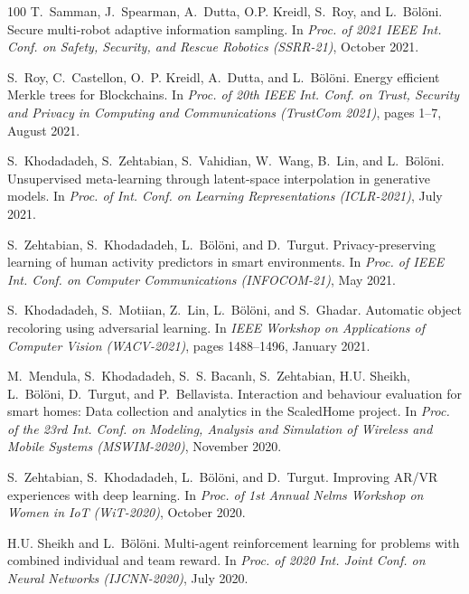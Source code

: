 \begin{thebibliography}{100}
T.~Samman, J.~Spearman, A.~Dutta, O.P. Kreidl, S.~Roy, and L.~Bölöni.
\newblock Secure multi-robot adaptive information sampling.
\newblock In {\em Proc. of 2021 IEEE Int. Conf. on Safety, Security, and Rescue
  Robotics (SSRR-21)}, October 2021.

S.~Roy, C.~Castellon, O.~P. Kreidl, A.~Dutta, and L.~Bölöni.
\newblock Energy efficient {M}erkle trees for {B}lockchains.
\newblock In {\em Proc. of 20th IEEE Int. Conf. on Trust, Security and Privacy
  in Computing and Communications (TrustCom 2021)}, pages 1--7, August 2021.

S.~Khodadadeh, S.~Zehtabian, S.~Vahidian, W.~Wang, B.~Lin, and L.~Bölöni.
\newblock Unsupervised meta-learning through latent-space interpolation in
  generative models.
\newblock In {\em Proc. of Int. Conf. on Learning Representations (ICLR-2021)},
  July 2021.

S.~Zehtabian, S.~Khodadadeh, L.~Bölöni, and D.~Turgut.
\newblock Privacy-preserving learning of human activity predictors in smart
  environments.
\newblock In {\em Proc. of IEEE Int. Conf. on Computer Communications
  (INFOCOM-21)}, May 2021.

S.~Khodadadeh, S.~Motiian, Z.~Lin, L.~Bölöni, and S.~Ghadar.
\newblock Automatic object recoloring using adversarial learning.
\newblock In {\em IEEE Workshop on Applications of Computer Vision
  (WACV-2021)}, pages 1488--1496, January 2021.

M.~Mendula, S.~Khodadadeh, S.~S. Bacanl{\i}, S.~Zehtabian, H.U. Sheikh,
  L.~Bölöni, D.~Turgut, and P.~Bellavista.
\newblock Interaction and behaviour evaluation for smart homes: Data collection
  and analytics in the {ScaledHome} project.
\newblock In {\em Proc. of the 23rd Int. Conf. on Modeling, Analysis and
  Simulation of Wireless and Mobile Systems (MSWIM-2020)}, November 2020.

S.~Zehtabian, S.~Khodadadeh, L.~Bölöni, and D.~Turgut.
\newblock Improving {AR/VR} experiences with deep learning.
\newblock In {\em Proc. of 1st Annual Nelms Workshop on Women in IoT
  (WiT-2020)}, October 2020.

H.U. Sheikh and L.~Bölöni.
\newblock Multi-agent reinforcement learning for problems with combined
  individual and team reward.
\newblock In {\em Proc. of 2020 Int. Joint Conf. on Neural Networks
  (IJCNN-2020)}, July 2020.


\end{thebibliography}
